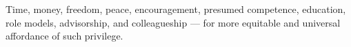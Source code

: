 Time, money, freedom, peace, encouragement, presumed competence, education, role models, advisorship, and colleagueship --- for more equitable and universal affordance of such privilege.
